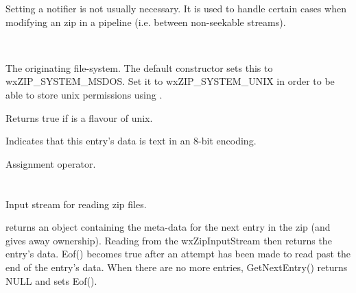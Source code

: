 Setting a notifier is not usually necessary. It is used to handle
certain cases when modifying an zip in a pipeline (i.e. between
non-seekable streams).


\\


\label{wxzipentrysystemmadeby}



The originating file-system. The default constructor sets this to
wxZIP\_SYSTEM\_MSDOS. Set it to wxZIP\_SYSTEM\_UNIX in order to be
able to store unix permissions using .


\label{wxzipentryismadebyunix}


Returns true if 
is a flavour of unix.


\label{wxzipentryistext}



Indicates that this entry's data is text in an 8-bit encoding.


\label{wxzipentryoperatorassign}


Assignment operator.


%
%

\section{}\label{wxzipinputstream}

Input stream for reading zip files.

 returns an
  object containing the meta-data
for the next entry in the zip (and gives away ownership). Reading from
the wxZipInputStream then returns the entry's data. Eof() becomes true
after an attempt has been made to read past the end of the entry's data.
When there are no more entries, GetNextEntry() returns NULL and sets Eof().


